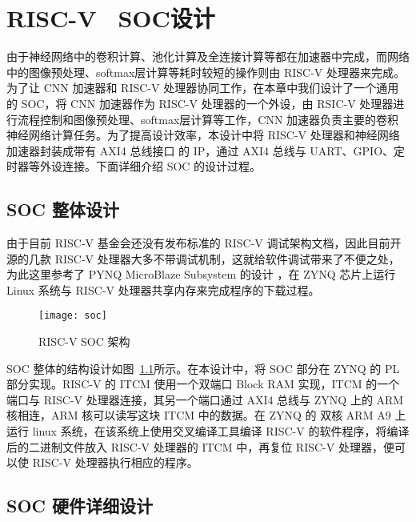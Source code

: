 \chapter{RISC-V \ SOC设计}\label{chap:soc}

由于神经网络中的卷积计算、池化计算及全连接计算等都在加速器中完成，而网络中的图像预处理、softmax层计算等耗时较短的操作则由 RISC-V 处理器来完成。为了让 CNN 加速器和 RISC-V 处理器协同工作，在本章中我们设计了一个通用的 SOC，将 CNN 加速器作为 RISC-V 处理器的一个外设，由 RSIC-V 处理器进行流程控制和图像预处理、softmax层计算等工作，CNN 加速器负责主要的卷积神经网络计算任务。为了提高设计效率，本设计中将 RISC-V 处理器和神经网络加速器封装成带有 AXI4 总线接口 的 IP，通过 AXI4 总线与 UART、GPIO、定时器等外设连接。下面详细介绍 SOC 的设计过程。

\section{SOC 整体设计}

由于目前 RISC-V 基金会还没有发布标准的 RISC-V 调试架构文档\citep{胡振波2018手把手教你设计}，因此目前开源的几款 RISC-V 处理器大多不带调试机制，这就给软件调试带来了不便之处，为此这里参考了 PYNQ MicroBlaze Subsystem 的设计 \citep{PYNQ_MB}，在 ZYNQ 芯片上运行 Linux 系统与 RISC-V 处理器共享内存来完成程序的下载过程。

\begin{figure}[!htbp]
    \centering
    \texttt{[image: soc]}
    \caption{RISC-V SOC 架构}
    \label{fig:soc}
\end{figure}

SOC 整体的结构设计如图~\ref{fig:soc}所示。在本设计中，将 SOC 部分在 ZYNQ 的 PL 部分实现。RISC-V 的 ITCM 使用一个双端口 Block RAM 实现，ITCM 的一个端口与 RISC-V 处理器连接，其另一个端口通过 AXI4 总线与 ZYNQ 上的 ARM 核相连，ARM 核可以读写这块 ITCM 中的数据。在 ZYNQ 的 双核 ARM A9 上运行 linux 系统，在该系统上使用交叉编译工具编译 RISC-V 的软件程序，将编译后的二进制文件放入 RISC-V 处理器的 ITCM 中，再复位 RISC-V 处理器，便可以使 RISC-V 处理器执行相应的程序。



\section{SOC 硬件详细设计}

